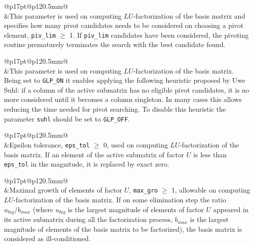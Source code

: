 \medskip

\noindent\begin{tabular}{@{}p{17pt}@{}p{120.5mm}@{}}
 \\
&This parameter is used on computing $LU$-factorization of the basis
matrix and specifies how many pivot candidates needs to be considered
on choosing a pivot element, \verb|piv_lim| $\geq$ 1. If \verb|piv_lim|
candidates have been considered, the pivoting routine prematurely
terminates the search with the best candidate found.\\
\end{tabular}

\medskip

\noindent\begin{tabular}{@{}p{17pt}@{}p{120.5mm}@{}}
 \\
&This parameter is used on computing $LU$-factorization of the basis
matrix. Being set to {\tt GLP\_ON} it enables applying the following
heuristic proposed by Uwe Suhl: if a column of the active submatrix has
no eligible pivot candidates, it is no more considered until it becomes
a column singleton. In many cases this allows reducing the time needed
for pivot searching. To disable this heuristic the parameter \verb|suhl|
should be set to {\tt GLP\_OFF}.\\
\end{tabular}

\medskip

\noindent\begin{tabular}{@{}p{17pt}@{}p{120.5mm}@{}}
 \\
&Epsilon tolerance, \verb|eps_tol| $\geq$ 0, used on computing
$LU$-factorization of the basis matrix. If an element of the active
submatrix of factor $U$ is less than \verb|eps_tol| in the magnitude,
it is replaced by exact zero.\\
\end{tabular}

\medskip

\noindent\begin{tabular}{@{}p{17pt}@{}p{120.5mm}@{}}
 \\
&Maximal growth of elements of factor $U$, \verb|max_gro| $\geq$ 1,
allowable on computing $LU$-factorization of the basis matrix. If on
some elimination step the ratio $u_{big}/b_{max}$ (where $u_{big}$ is
the largest magnitude of elements of factor $U$ appeared in its active
submatrix during all the factorization process, $b_{max}$ is the largest
magnitude of elements of the basis matrix to be factorized), the basis
matrix is considered as ill-conditioned.\\
\end{tabular}

